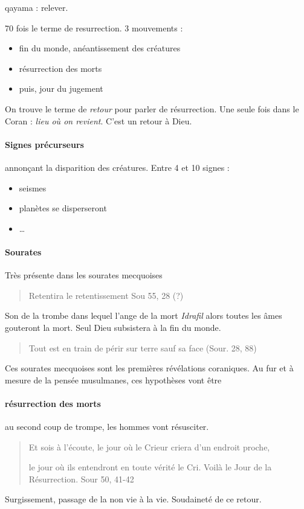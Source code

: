 qayama : relever.

70 fois le terme de resurrection.
3 mouvements : 
\begin{itemize}
    \item fin du monde, anéantissement des créatures
    \item résurrection des morts
    \item puis, jour du jugement
\end{itemize}
On trouve le terme de \textit{retour} pour parler de résurrection. Une seule fois dans le Coran : \textit{lieu où on revient}. C'est un retour à Dieu. 


\paragraph{Signes précurseurs} annonçant la disparition des créatures. Entre 4 et 10 signes : 
\begin{itemize}
    \item seismes
    \item planètes se disperseront
    \item \ldots
\end{itemize}

\paragraph{Sourates}
Très présente dans les sourates mecquoises 
\begin{quote}
   Retentira le retentissement  Sou 55, 28 (?)
\end{quote}
Son de la trombe dans lequel l'ange de la mort \textit{Idrafil} alors toutes les âmes gouteront la mort. Seul Dieu subsistera à la fin du monde.
\begin{quote}
    Tout est en train de périr sur terre sauf sa face (Sour. 28, 88)
\end{quote}
Ces sourates mecquoises sont les premières révélations coraniques.
Au fur et à mesure de la pensée musulmanes, ces hypothèses vont être 

\paragraph{résurrection des morts} au second coup de trompe, les hommes vont résusciter.
\begin{quote}


Et sois à l'écoute, le jour où le Crieur criera d'un endroit proche,


le jour où ils entendront en toute vérité le Cri. Voilà le Jour de la Résurrection.
    Sour 50, 41-42
\end{quote}
Surgissement, passage de la non vie à la vie. Soudaineté de ce retour.

